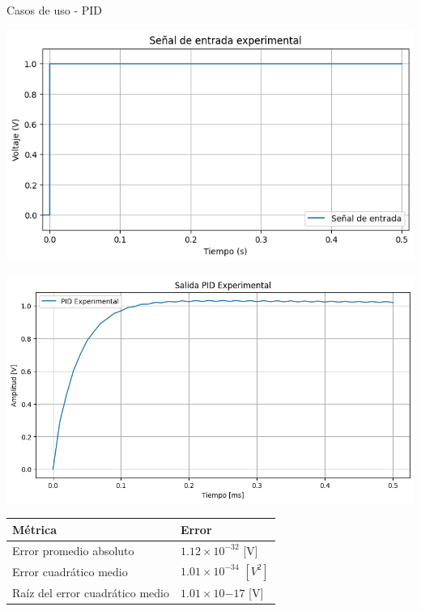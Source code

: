 \documentclass[10pt,aspectratio=169]{beamer} %
\begin{document}
\begin{frame}{Casos de uso - PID}
  \begin{minipage}{0.4\linewidth}
    \centering
    \includegraphics[scale=0.2]{PID/entrada_experimental.png}
  \end{minipage}%
  \hfill
  \begin{minipage}{0.4\linewidth}
    \centering
    \includegraphics[scale=0.17]{PID/salida_experimental.png}
  \end{minipage}

  \vspace{0.2cm} %
    \begin{minipage}{0.9\linewidth} %
      \centering
      \begin{tabular}{ll}
        Métrica                       & Error \\ \hline
        Error promedio absoluto         &   $1.12\times 10^{-32}$ [V]\\
        Error cuadrático medio          &   $1.01 \times 10^{-34}$ $[V^{2}]$    \\
        Raíz del error cuadrático medio &   $1.01 \times 10{-17}$ [V]  
        \end{tabular}
    \end{minipage}
\end{frame}
\end{document}

